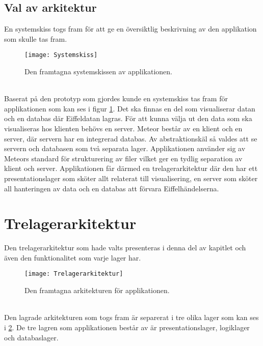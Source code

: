 \subsection{Val av arkitektur}
En systemskiss togs fram för att ge en översiktlig beskrivning av den applikation som skulle tas fram.
\begin{figure}[h]
    \centering
    \texttt{[image: Systemskiss]}
    \caption{Den framtagna systemskissen av applikationen.}
    \label{fig:architectural_overview}
\end{figure}
\ \\
Baserat på den prototyp som gjordes kunde en systemskiss tas fram för applikationen som kan ses i figur \ref{fig:architectural_overview}. Det ska finnas en del som visualiserar datan och en databas där Eiffeldatan lagras. För att kunna välja ut den data som ska visualiseras hos klienten behövs en server. Meteor består av en klient och en server, där servern har en integrerad databas. Av abstraktionskäl så valdes att se servern och databasen som två separata lager. Applikationen använder sig av Meteors standard för strukturering av filer vilket ger en tydlig separation av klient och server.\cite{website:meteorstructure} Applikationen får därmed en trelagerarkitektur där den har ett presentationslager som sköter allt relaterat till visualisering, en server som sköter all hanteringen av data och en databas att förvara Eiffelhändelserna.
\newpage
\section{Trelagerarkitektur}
Den trelagerarkitektur som hade valts presenteras i denna del av kapitlet och även den funktionalitet som varje lager har.
\begin{figure}[h]
    \centering
    \texttt{[image: Trelagerarkitektur]}
    \caption{Den framtagna arkitekturen för applikationen.}
    \label{fig:layer_architecture}
\end{figure}
\ \\
Den lagrade arkitekturen som togs fram är separerat i tre olika lager som kan ses i \ref{fig:layer_architecture}. De tre lagren som applikationen består av är presentationslager, logiklager och databaslager.
